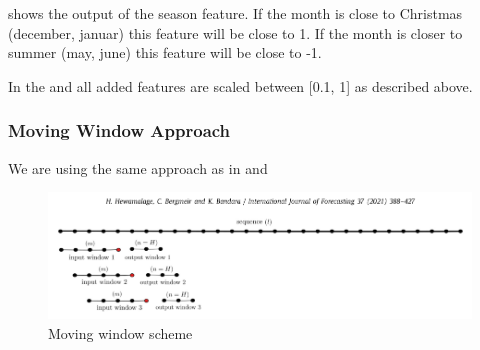  shows the output of the season feature.
If the month is close to Christmas (december, januar) this feature will be close to 1.
If the month is closer to summer (may, june) this feature will be close to -1.

In the and all added features are scaled between [0.1, 1] as described above.

\subsubsection{Moving Window Approach}
We are using the same approach  as in \cite{Bandara2019} %
and \cite{Hewamalage2021}%
\begin{figure}[h!]
  \centering
  \includegraphics[width=\textwidth]{./figs/illustrations/moving_window_illustration.png}
  \hfill
  \caption{Moving window scheme \citep{Hewamalage2021}}
  \label{fig:dataset:moving_window_scheme}
\end{figure}
